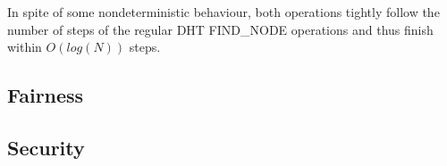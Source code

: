 In spite of some nondeterministic behaviour, both operations tightly follow the number of steps of the regular DHT FIND\_NODE operations and thus finish within $O(log(N))$ steps.

\subsection{Fairness}


\subsection{Security}